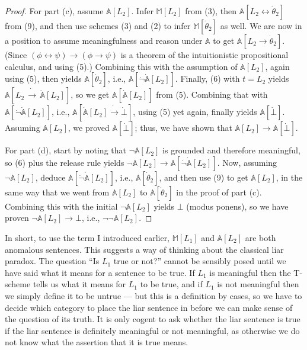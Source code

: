 \documentclass{amsart}
\theoremstyle{definition}
\begin{document}
\begin{proof}
For part (c), assume $\mathbb{A}[L_2]$. Infer $\mathbb{M}[L_2]$ from (3), then $\mathbb{A}[L_2 \leftrightarrow \dot{\theta}_2]$ from (9), and then use schemes (3) and (2) to infer $\mathbb{M}[\dot{\theta}_2]$ as well. We are now in a position to assume meaningfulness and reason under $\mathbb{A}$ to get $\mathbb{A}[L_2 \to \dot{\theta}_2]$. (Since $(\phi \leftrightarrow \psi) \to (\phi \to \psi)$ is a theorem of the intuitionistic propositional calculus, and using (5).) Combining this with the assumption of $\mathbb{A}[L_2]$, again using (5), then yields $\mathbb{A}[\dot{\theta}_2]$, i.e., $\mathbb{A}[\dot{\neg}\dot{\mathbb{A}}[L_2]]$. Finally, (6) with $t = L_2$ yields $\mathbb{A}[L_2\, \dot{\to}\, \dot{\mathbb{A}}[L_2]]$, so we get $\mathbb{A}[\dot{\mathbb{A}}[L_2]]$ from (5). Combining that with $\mathbb{A}[\dot{\neg}\dot{\mathbb{A}}[L_2]]$, i.e., $\mathbb{A}[\dot{\mathbb{A}}[L_2] \dot{\to} \dot{\bot}]$, using (5) yet again, finally yields $\mathbb{A}[\dot{\bot}]$. Assuming $\mathbb{A}[L_2]$, we proved $\mathbb{A}[\dot{\bot}]$; thus, we have shown that $\mathbb{A}[L_2] \to \mathbb{A}[\dot{\bot}]$.

For part (d), start by noting that $\neg\mathbb{A}[L_2]$ is grounded and therefore meaningful, so (6) plus the release rule yields $\neg\mathbb{A}[L_2] \to \mathbb{A}[\dot{\neg}\dot{\mathbb{A}}[L_2]]$. Now, assuming $\neg\mathbb{A}[L_2]$, deduce $\mathbb{A}[\dot{\neg}\dot{\mathbb{A}}[L_2]]$, i.e., $\mathbb{A}[\dot{\theta}_2]$, and then use (9) to get $\mathbb{A}[L_2]$, in the same way that we went from $\mathbb{A}[L_2]$ to $\mathbb{A}[\dot{\theta}_2]$ in the proof of part (c). Combining this with the initial $\neg\mathbb{A}[L_2]$ yields $\bot$ (modus ponens), so we have proven $\neg\mathbb{A}[L_2] \to \bot$, i.e., $\neg\neg\mathbb{A}[L_2]$.
\end{proof}

In short, to use the term I introduced earlier, $\mathbb{M}[L_1]$ and $\mathbb{A}[L_2]$ are both anomalous sentences. This suggests a way of thinking about the classical liar paradox. The question ``Is $L_1$ true or not?'' cannot be sensibly posed until we have said what it means for a sentence to be true. If $L_1$ is meaningful then the T-scheme tells us what it means for $L_1$ to be true, and if $L_1$ is not meaningful then we simply define it to be untrue --- but this is a definition by cases, so we have to decide which category to place the liar sentence in before we can make sense of the question of its truth. It is only cogent to ask whether the liar sentence is true if the liar sentence is definitely meaningful or not meaningful, as otherwise we do not know what the assertion that it is true means.
\end{document}
